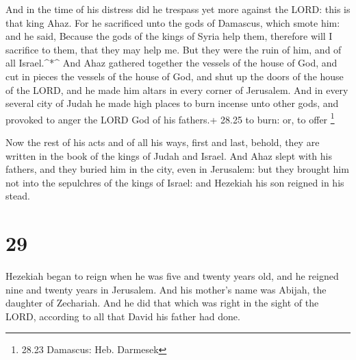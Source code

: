  And in the time of his distress did he trespass yet more
against the LORD: this is that king Ahaz.  For he
sacrificed unto the gods of Damascus, which smote him: and he said,
Because the gods of the kings of Syria help them, therefore will I
sacrifice to them, that they may help me. But they were the ruin of him,
and of all Israel.\^{}*\^{}  And Ahaz gathered together the
vessels of the house of God, and cut in pieces the vessels of the house
of God, and shut up the doors of the house of the LORD, and he made him
altars in every corner of Jerusalem.  And in every several
city of Judah he made high places to burn incense unto other gods, and
provoked to anger the LORD God of his fathers.+ 28.25 to burn: or, to
offer \footnote{28.23 Damascus: Heb. Darmesek}

 Now the rest of his acts and of all his ways, first and
last, behold, they are written in the book of the kings of Judah and
Israel.  And Ahaz slept with his fathers, and they buried
him in the city, even in Jerusalem: but they brought him not into the
sepulchres of the kings of Israel: and Hezekiah his son reigned in his
stead.

\hypertarget{section-28}{%
\section{29}\label{section-28}}

 Hezekiah began to reign when he was five and twenty years
old, and he reigned nine and twenty years in Jerusalem. And his mother's
name was Abijah, the daughter of Zechariah.  And he did that
which was right in the sight of the LORD, according to all that David
his father had done.

